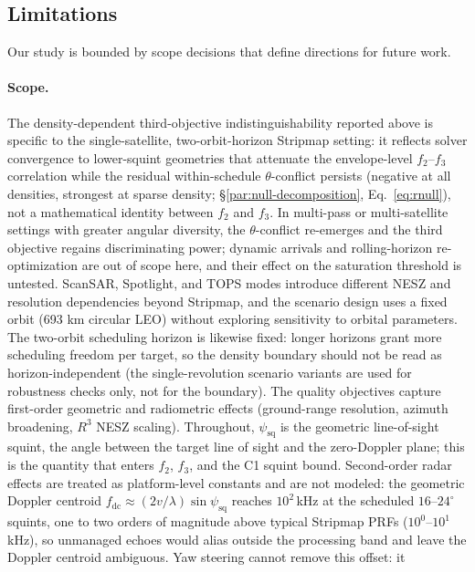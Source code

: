 \documentclass[preprint,12pt,authoryear]{elsarticle}
\begin{document}
\subsection{Limitations}\label{sec:limitations}
Our study is bounded by scope decisions that define directions for future work.

\paragraph{Scope.}
The density-dependent third-objective indistinguishability reported above is specific to the
single-satellite, two-orbit-horizon Stripmap setting: it reflects solver convergence to lower-squint
geometries that attenuate the envelope-level $f_2$--$f_3$ correlation while
the residual within-schedule $\theta$-conflict persists (negative at all
densities, strongest at sparse density; \S\ref{par:null-decomposition},
Eq.~\ref{eq:rnull}), not a mathematical
identity between $f_2$ and $f_3$. In multi-pass or multi-satellite
settings with greater angular diversity, the $\theta$-conflict re-emerges
and the third objective regains discriminating power; dynamic arrivals and
rolling-horizon re-optimization are out of scope here, and their effect on
the saturation threshold is untested.
ScanSAR, Spotlight, and TOPS modes introduce different NESZ and resolution
dependencies beyond Stripmap, and the scenario design uses a fixed orbit
(693 km circular LEO) without exploring sensitivity to orbital parameters.
The two-orbit scheduling horizon is likewise fixed: longer horizons grant
more scheduling freedom per target, so the density boundary should not be
read as horizon-independent (the single-revolution scenario variants are
used for robustness checks only, not for the boundary).
The quality objectives capture first-order geometric and radiometric
effects (ground-range resolution, azimuth broadening, $R^3$ NESZ scaling).
Throughout, $\psi_{\text{sq}}$ is the geometric line-of-sight squint, the
angle between the target line of sight and the zero-Doppler plane; this is
the quantity that enters $f_2$, $f_3$, and the C1 squint bound. Second-order
radar effects are treated as platform-level constants and are not modeled:
the geometric Doppler centroid $f_{\text{dc}} \approx (2v/\lambda)\sin\psi_{\text{sq}}$
reaches $10^2$\,kHz at the scheduled $16$--$24^\circ$ squints, one to two
orders of magnitude above typical Stripmap PRFs ($10^0$--$10^1$\,kHz), so
unmanaged echoes would alias outside the processing band and leave the
Doppler centroid ambiguous. Yaw steering cannot remove this offset: it
\end{document}
